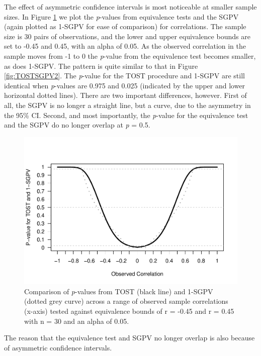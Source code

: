 \documentclass[,man,floatsintext]{apa6}
\begin{document}
The effect of asymmetric confidence intervals is most noticeable at smaller sample sizes. In Figure \ref{fig:TOSTSGPV11} we plot the \emph{p}-values from equivalence tests and the SGPV (again plotted as 1-SGPV for ease of comparison) for correlations. The sample size is 30 pairs of observations, and the lower and upper equivalence bounds are set to -0.45 and 0.45, with an alpha of 0.05. As the observed correlation in the sample moves from -1 to 0 the \emph{p}-value from the equivalence test becomes smaller, as does 1-SGPV. The pattern is quite similar to that in Figure \ref{fig:TOSTSGPV2}. The \emph{p}-value for the TOST procedure and 1-SGPV are still identical when \emph{p}-values are 0.975 and 0.025 (indicated by the upper and lower horizontal dotted lines). There are two important differences, however. First of all, the SGPV is no longer a straight line, but a curve, due to the asymmetry in the 95\% CI. Second, and most importantly, the \emph{p}-value for the equivalence test and the SGPV do no longer overlap at \emph{p} = 0.5.

\begin{figure}
\centering
\includegraphics{manuscript_files/figure-latex/TOSTSGPV11-1.pdf}
\caption{\label{fig:TOSTSGPV11}Comparison of \emph{p}-values from TOST (black line) and 1-SGPV (dotted grey curve) across a range of observed sample correlations (x-axis) tested against equivalence bounds of r = -0.45 and r = 0.45 with n = 30 and an alpha of 0.05.}
\end{figure}

The reason that the equivalence test and SGPV no longer overlap is also because of asymmetric confidence intervals.
\end{document}
